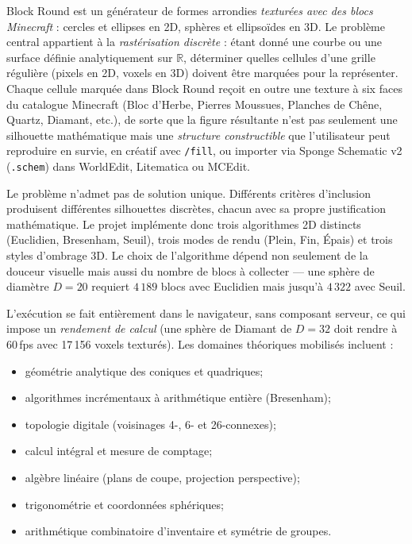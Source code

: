 \documentclass[12pt,a4paper]{scrartcl}
\newcommand{\code}[1]{\texttt{\small #1}}
\newcommand{\cmd}[1]{\textcolor{earth}{\texttt{\small #1}}}
\begin{document}
Block Round est un générateur de formes arrondies \emph{texturées avec des blocs Minecraft} : cercles et ellipses en 2D, sphères et ellipsoïdes en 3D. Le problème central appartient à la \emph{rastérisation discrète} : étant donné une courbe ou une surface définie analytiquement sur $\mathbb{R}$, déterminer quelles cellules d'une grille régulière (pixels en 2D, voxels en 3D) doivent être marquées pour la représenter. Chaque cellule marquée dans Block Round reçoit en outre une texture à six faces du catalogue Minecraft (Bloc d'Herbe, Pierres Moussues, Planches de Chêne, Quartz, Diamant, etc.), de sorte que la figure résultante n'est pas seulement une silhouette mathématique mais une \emph{structure constructible} que l'utilisateur peut reproduire en survie, en créatif avec \cmd{/fill}, ou importer via Sponge Schematic v2 (\code{.schem}) dans WorldEdit, Litematica ou MCEdit.

Le problème n'admet pas de solution unique. Différents critères d'inclusion produisent différentes silhouettes discrètes, chacun avec sa propre justification mathématique. Le projet implémente donc trois algorithmes 2D distincts (Euclidien, Bresenham, Seuil), trois modes de rendu (Plein, Fin, Épais) et trois styles d'ombrage 3D. Le choix de l'algorithme dépend non seulement de la douceur visuelle mais aussi du nombre de blocs à collecter --- une sphère de diamètre $D=20$ requiert $4\,189$ blocs avec Euclidien mais jusqu'à $4\,322$ avec Seuil.

L'exécution se fait entièrement dans le navigateur, sans composant serveur, ce qui impose un \emph{rendement de calcul} (une sphère de Diamant de $D=32$ doit rendre à 60\,fps avec 17\,156 voxels texturés). Les domaines théoriques mobilisés incluent :
\begin{itemize}[leftmargin=1.3em,itemsep=0.15em,topsep=0.3em]
  \item géométrie analytique des coniques et quadriques;
  \item algorithmes incrémentaux à arithmétique entière (Bresenham);
  \item topologie digitale (voisinages 4-, 6- et 26-connexes);
  \item calcul intégral et mesure de comptage;
  \item algèbre linéaire (plans de coupe, projection perspective);
  \item trigonométrie et coordonnées sphériques;
  \item arithmétique combinatoire d'inventaire et symétrie de groupes.
\end{itemize}
\end{document}
